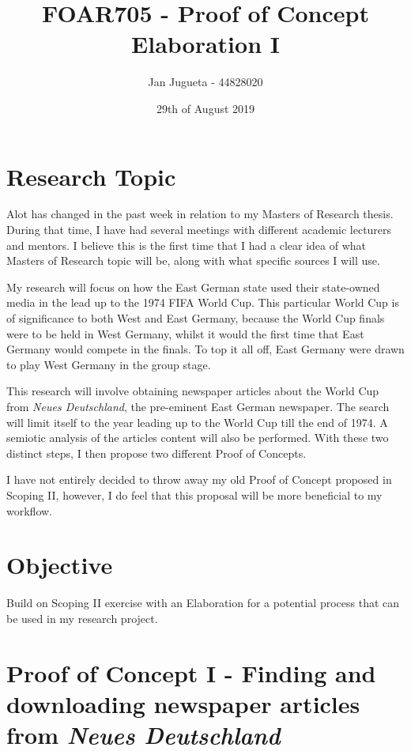 \documentclass{article}
\title{FOAR705 - Proof of Concept Elaboration I}
\author{Jan Jugueta - 44828020}
\date{29th of August 2019}
\begin{document}
\maketitle

\section*{Research Topic}

Alot has changed in the past week in relation to my Masters of Research thesis. During that time, I have had several meetings with different academic lecturers and mentors. I believe this is the first time that I had a clear idea of what Masters of Research topic will be, along with what specific sources I will use.

My research will focus on how the East German state used their state-owned media in the lead up to the 1974 FIFA World Cup. This particular World Cup is of significance to both West and East Germany, because the World Cup finals were to be held in West Germany, whilst it would the first time that East Germany would compete in the finals. To top it all off, East Germany were drawn to play West Germany in the group stage.

This research will involve obtaining newspaper articles about the World Cup from \textit{Neues Deutschland}, the pre-eminent East German newspaper. The search will limit itself to the year leading up to the World Cup till the end of 1974. A semiotic analysis of the articles content will also be performed. With these two distinct steps, I then propose two different Proof of Concepts. 

I have not entirely decided to throw away my old Proof of Concept proposed in Scoping II, however, I do feel that this proposal will be more beneficial to my workflow.

\section*{Objective}

Build on Scoping II exercise with an Elaboration for a potential process that can be used in my research project.

\newpage
\section*{Proof of Concept I - Finding and downloading newspaper articles from \textit{Neues Deutschland}}
\end{document}

